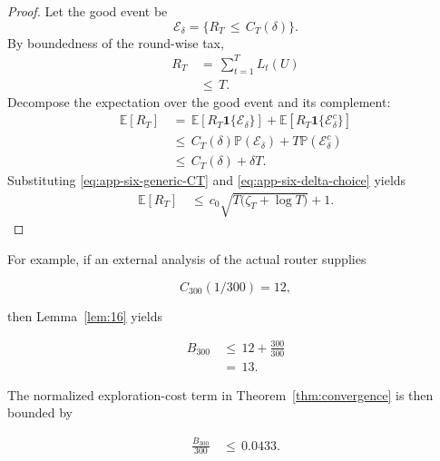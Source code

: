 \documentclass{article} %
\begin{document}
\begin{proof}
Let the good event be
\begin{equation}
\label{eq:app-six-good-event}
\mathcal{E}_\delta
=
\{R_T\,\le\, C_T(\delta)\}.
\end{equation}
By boundedness of the round-wise tax,
\begin{align}
\label{eq:app-six-RT-trivial-bound}
R_T
&\,=\,
\sum_{t=1}^{T}L_t(U)
\\
&\,\le\,
T.
\end{align}
Decompose the expectation over the good event and its complement:
\begin{align}
\label{eq:app-six-proof-expectation-split}
\mathbb{E}[R_T]
&\,=\,
\mathbb{E}[R_T\mathbf{1}\{\mathcal{E}_\delta\}]
+
\mathbb{E}[R_T\mathbf{1}\{\mathcal{E}_\delta^c\}]
\\
&\,\le\,
C_T(\delta)\mathbb{P}(\mathcal{E}_\delta)
+
T\mathbb{P}(\mathcal{E}_\delta^c)
\\
&\,\le\,
C_T(\delta)+\delta T.
\end{align}
Substituting \eqref{eq:app-six-generic-CT} and \eqref{eq:app-six-delta-choice} yields
\begin{align}
\label{eq:app-six-proof-generic-BT}
\mathbb{E}[R_T]
&\,\le\,
c_0\sqrt{T\bigl(\zeta_T+\log T\bigr)}
+
1.
\end{align}
\end{proof}

For example, if an external analysis of the actual router supplies

\begin{equation}
\label{eq:app-six-bridge-example-CT}
C_{300}(1/300)=12,
\end{equation}

then Lemma~\ref{lem:16} yields

\begin{align}
\label{eq:app-six-bridge-example-BT}
B_{300}
&\,\le\,
12+\frac{300}{300}
\\
&\,=\,
13.
\end{align}

The normalized exploration-cost term in Theorem~\ref{thm:convergence} is then bounded by

\begin{align}
\label{eq:app-six-bridge-example-normalized}
\frac{B_{300}}{300}
&\,\le\,
0.0433.
\end{align}
\end{document}
